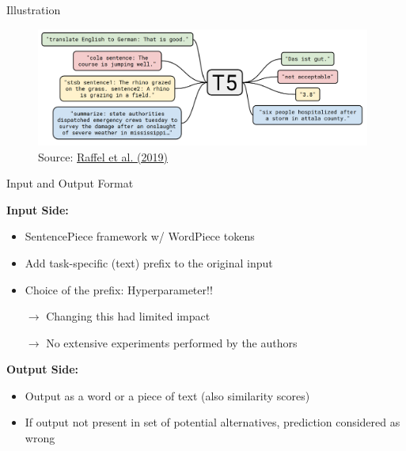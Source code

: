 
\begin{frame}{Illustration}

\vfill
	
	\begin{figure}
		\centering
		\includegraphics[width = 11cm]{figure/t5.png}\\ 
		\footnotesize{Source:} \href{https://arxiv.org/pdf/1910.10683.pdf}{\footnotesize Raffel et al. (2019)}
	\end{figure}
	
\vfill

\end{frame}


\begin{frame}{Input and Output Format}

\vfill

	\textbf{Input Side:}

	\begin{itemize}
		\item SentencePiece framework w/ WordPiece tokens
		\item Add task-specific (text) prefix to the original input
		\item Choice of the prefix: Hyperparameter!! 
		\item[$\to$] Changing this had limited impact
		\item[$\to$] No extensive experiments performed by the authors
	\end{itemize}
	
	\vspace{.5cm}

	\textbf{Output Side:}

	\begin{itemize}
		\item Output as a word or a piece of text (also similarity scores)
		\item If output not present in set of potential alternatives, prediction considered as wrong
	\end{itemize}
	
\vfill

\end{frame}

